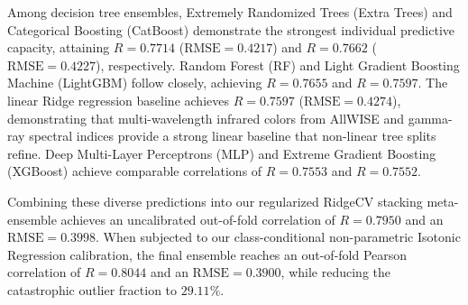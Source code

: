 \documentclass[twocolumn,linenumbers,floatfix]{aastex701}
\begin{document}
Among decision tree ensembles, Extremely Randomized Trees (Extra Trees) and Categorical Boosting (CatBoost) demonstrate the strongest individual predictive capacity, attaining $R = 0.7714$ ($\text{RMSE} = 0.4217$) and $R = 0.7662$ ($\text{RMSE} = 0.4227$), respectively. Random Forest (RF) and Light Gradient Boosting Machine (LightGBM) follow closely, achieving $R = 0.7655$ and $R = 0.7597$. The linear Ridge regression baseline achieves $R = 0.7597$ ($\text{RMSE} = 0.4274$), demonstrating that multi-wavelength infrared colors from AllWISE and gamma-ray spectral indices provide a strong linear baseline that non-linear tree splits refine. Deep Multi-Layer Perceptrons (MLP) and Extreme Gradient Boosting (XGBoost) achieve comparable correlations of $R = 0.7553$ and $R = 0.7552$.

Combining these diverse predictions into our regularized RidgeCV stacking meta-ensemble achieves an uncalibrated out-of-fold correlation of $R = 0.7950$ and an $\text{RMSE} = 0.3998$. When subjected to our class-conditional non-parametric Isotonic Regression calibration, the final ensemble reaches an out-of-fold Pearson correlation of $R = 0.8044$ and an $\text{RMSE} = 0.3900$, while reducing the catastrophic outlier fraction to $29.11\%$.
\end{document}
